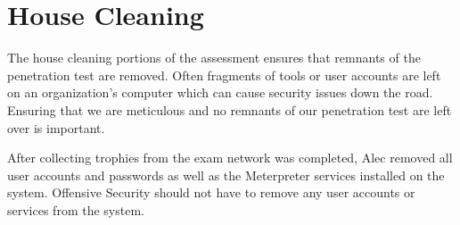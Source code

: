 
\section{\label{sec:house_cleaning}House Cleaning}
The house cleaning portions of the assessment ensures that remnants of the
penetration test are removed. Often fragments of tools or user accounts are
left on an organization's computer which can cause security issues down the
road. Ensuring that we are meticulous and no remnants of our penetration test
are left over is important.

After collecting trophies from the exam network was completed, Alec removed all
user accounts and passwords as well as the Meterpreter services installed on
the system. Offensive Security should not have to remove any user accounts or
services from the system.
